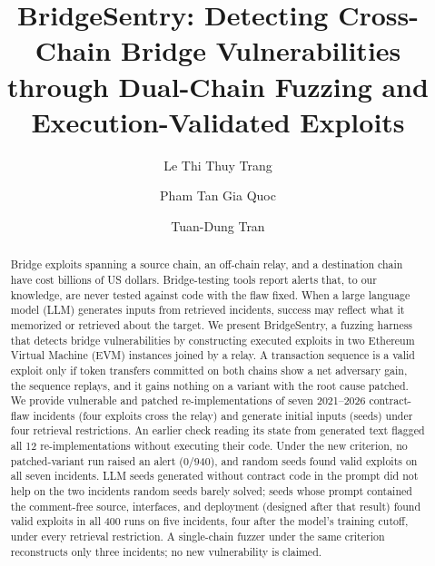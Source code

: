 \documentclass[a4paper]{cas-sc}
\begin{document}

\title[mode=title]{BridgeSentry: Detecting Cross-Chain Bridge Vulnerabilities through Dual-Chain Fuzzing and Execution-Validated Exploits}

\author[1,2]{Le Thi Thuy Trang}
\author[1,2]{Pham Tan Gia Quoc}
\author[1,2]{Tuan-Dung Tran}
\cormark[1]


\begin{abstract}
Bridge exploits spanning a source chain, an off-chain relay, and a destination chain have cost billions of US dollars. Bridge-testing tools report alerts that, to our knowledge, are never tested against code with the flaw fixed. When a large language model (LLM) generates inputs from retrieved incidents, success may reflect what it memorized or retrieved about the target. We present BridgeSentry, a fuzzing harness that detects bridge vulnerabilities by constructing executed exploits in two Ethereum Virtual Machine (EVM) instances joined by a relay. A transaction sequence is a valid exploit only if token transfers committed on both chains show a net adversary gain, the sequence replays, and it gains nothing on a variant with the root cause patched. We provide vulnerable and patched re-implementations of seven 2021--2026 contract-flaw incidents (four exploits cross the relay) and generate initial inputs (seeds) under four retrieval restrictions. An earlier check reading its state from generated text flagged all 12 re-implementations without executing their code. Under the new criterion, no patched-variant run raised an alert (0/940), and random seeds found valid exploits on all seven incidents. LLM seeds generated without contract code in the prompt did not help on the two incidents random seeds barely solved; seeds whose prompt contained the comment-free source, interfaces, and deployment (designed after that result) found valid exploits in all 400 runs on five incidents, four after the model's training cutoff, under every retrieval restriction. A single-chain fuzzer under the same criterion reconstructs only three incidents; no new vulnerability is claimed.
\end{abstract}
\end{document}
